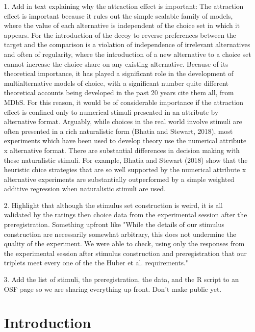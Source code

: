 \documentclass[12pt, a4paper]{article}
\begin{document}
1. Add in text explaining why the attraction effect is important: The attraction effect is important because it rules out the simple scalable family of models, where the value of each alternative is independent of the choice set in which it appears. For the introduction of the decoy to reverse preferences between the target and the comparison is a violation of independence of irrelevant alternatives and often of regularity, where the introduction of a new alternative to a choice set cannot increase the choice share on any existing alternative. Because of its theoretical importance, it has played a significant role in the development of multialternative models of choice, with a significant number quite different theoretical accounts being developed in the past 20 years {cite them all, from MDbS}. For this reason, it would be of considerable importance if the attraction effect is confined only to numerical stimuli presented in an attribute by alternative format. Arguably, while choices in the real world involve stimuli are often presented in a rich naturalistic form (Bhatia and Stewart, 2018), most experiments which have been used to develop theory use the numerical attribute x alternative format. There are substantial differences in decision making with these naturalistic stimuli. For example, Bhatia and Stewart (2018) show that the heuristic chice strategies that are so well supported by  the numerical attribute x alternative experiments are substantially outperformed by a simple weighted additive regression when naturalistic stimuli are used.

2. Highlight that although the stimulus set construction is weird, it is all validated by the ratings then choice data from the experimental session after the preregistration. Something upfront like "While the details of our stimulus construction are necessarily somewhat arbitrary, this does not undermine the quality of the experiment. We were able to check, using only the responses from the experimental session after stimulus construction and preregistration that our triplets meet every one of the the Huber et al. requirements."

3. Add the list of stimuli, the preregistration, the data, and the R script to an OSF page so we are sharing everything up front. Don't make public yet.

\section{Introduction}
\end{document}
